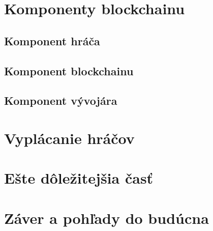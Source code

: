 \documentclass[10pt,twoside,slovak,a4paper]{article}
\begin{document}
\section{Komponenty blockchainu} \label{komponenty}


\subsection{Komponent hráča} \label{komponenty:hrac}


\subsection{Komponent blockchainu} \label{komponenty:blockchain}


\subsection{Komponent vývojára} \label{komponenty:vyvojar}



\section{Vyplácanie hráčov} \label{vyplacanie}



\section{Ešte dôležitejšia časť} \label{dolezitejsia}




\section{Záver a pohľady do budúcna} \label{zaver}





\end{document}
